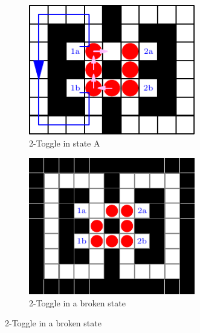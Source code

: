 \documentclass[11pt]{article}
\begin{document}
\begin{figure}[!ht]
\centering
\begin{subfigure}[b]{0.45\textwidth}
  \centering
    \includegraphics[width=0.8\textwidth]{2-toggleA}
    \caption{2-Toggle in state A}
    \label{2toggleA}
\end{subfigure}

\begin{subfigure}[b]{0.45\textwidth}
  \centering
    \includegraphics[width=0.8\textwidth]{broken2Toggle}
    \caption{2-Toggle in a broken state}
    \label{broken2toggle}
    \end{subfigure}
\end{figure}
\end{document}
